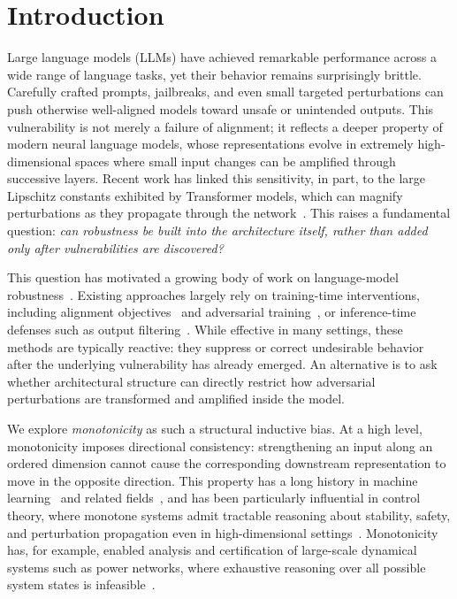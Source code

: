 \documentclass{article}
\theoremstyle{plain}
\theoremstyle{definition}
\theoremstyle{remark}
\begin{document}
\section{Introduction}
\label{sec:intro}

Large language models (LLMs) have achieved remarkable performance across a wide range of language tasks, yet their behavior remains surprisingly brittle. Carefully crafted prompts, jailbreaks, and even small targeted perturbations can push otherwise well-aligned models toward unsafe or unintended outputs. This vulnerability is not merely a failure of alignment; it reflects a deeper property of modern neural language models, whose representations evolve in extremely high-dimensional spaces where small input changes can be amplified through successive layers. Recent work has linked this sensitivity, in part, to the large Lipschitz constants exhibited by Transformer models, which can magnify perturbations as they propagate through the network~\citep{newhouse2025training}. This raises a fundamental question: \emph{can robustness be built into the architecture itself, rather than added only after vulnerabilities are discovered?}

This question has motivated a growing body of work on language-model robustness~\citep{wei2023jailbroken, su2024mission}.
Existing approaches largely rely on training-time interventions, including alignment objectives~\citep{cao2024defending} and adversarial training~\citep{howe2024effects}, or inference-time defenses such as output filtering~\citep{khachaturov2025adversarial}. While effective in many settings, these methods are typically reactive: they suppress or correct undesirable behavior after the underlying vulnerability has already emerged. An alternative is to ask whether architectural structure can directly restrict how adversarial perturbations are transformed and amplified inside the model.

We explore \emph{monotonicity} as such a structural inductive bias. At a high level, monotonicity imposes directional consistency: strengthening an input along an ordered dimension cannot cause the corresponding downstream representation to move in the opposite direction. This property has a long history in machine learning~\citep{Gupta2016MonotonicLattices, runje2023constrained} and related fields~\citep{smith1995monotone}, and has been particularly influential in control theory, where monotone systems admit tractable reasoning about stability, safety, and perturbation propagation even in high-dimensional settings~\citep{michel2015stability,ito2014max}. Monotonicity has, for example, enabled analysis and certification of large-scale dynamical systems such as power networks, where exhaustive reasoning over all possible system states is infeasible~\citep{rantzer2014control}.
\end{document}
